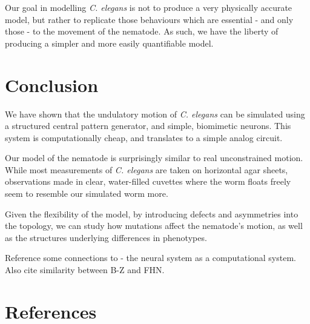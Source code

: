 \documentclass[
    11pt,
]{article}
\begin{document}
Our goal in modelling \emph{C. elegans} is not to produce a very physically accurate model, but rather to replicate those behaviours which are essential - and only those - to the movement of the nematode.  As such, we have the liberty of producing a simpler and more easily quantifiable model.

\section{Conclusion}

We have shown that the undulatory motion of \emph{C. elegans} can be simulated using a structured central pattern generator, and simple, biomimetic neurons.  This system is computationally cheap, and translates to a simple analog circuit.

Our model of the nematode is surprisingly similar to real unconstrained motion.  While most measurements of \emph{C. elegans} are taken on horizontal agar sheets, observations made in clear, water-filled cuvettes where the worm floats freely seem to resemble our simulated worm more.

Given the flexibility of the model, by introducing defects and asymmetries into the topology, we can study how mutations affect the nematode's motion, as well as the structures underlying differences in phenotypes.


Reference some connections to \citet{adamatzky2008} - the neural system as a computational system.  Also cite similarity between B-Z and FHN.

\section{References}

% 
\printbibliography[heading=none]
\end{document}
